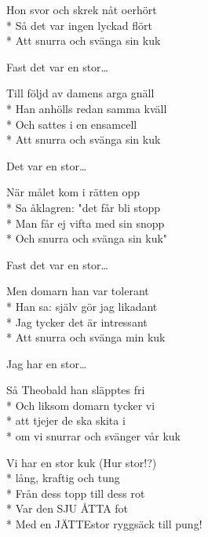\begin{SongText}
\begin{SongVerse}
        Hon svor och skrek nåt oerhört\\*%
        Så det var ingen lyckad flört\\*%
        Att snurra och svänga sin kuk
    \end{SongVerse}
    \begin{SongVerse}
        Fast det var en stor…
    \end{SongVerse}
    \begin{SongVerse}
        Till följd av damens arga gnäll\\*%
        Han anhölls redan samma kväll\\*%
        Och sattes i en ensamcell\\*%
        Att snurra och svänga sin kuk
    \end{SongVerse}
    \begin{SongVerse}
        Det var en stor…
    \end{SongVerse}
    \begin{SongVerse}
        När målet kom i rätten opp\\*%
        Sa åklagren: "det får bli stopp\\*%
        Man får ej vifta med sin snopp\\*%
        Och snurra och svänga sin kuk"
    \end{SongVerse}
    \begin{SongVerse}
        Fast det var en stor…
    \end{SongVerse}
    \begin{SongVerse}
        Men domarn han var tolerant\\*%
        Han sa: själv gör jag likadant\\*%
        Jag tycker det är intressant\\*%
        Att snurra och svänga min kuk
    \end{SongVerse}
    \begin{SongVerse}
        Jag har en stor…
    \end{SongVerse}
    \begin{SongVerse}
        Så Theobald han släpptes fri\\*%
        Och liksom domarn tycker vi\\*%
        att tjejer de ska skita i\\*%
        om vi snurrar och svänger vår kuk
    \end{SongVerse}
    \begin{SongVerse}
        Vi har en stor kuk (Hur stor!?)\\*%
        lång, kraftig och tung\\*%
        Från dess topp till dess rot\\*%
        Var den SJU ÅTTA fot\\*%
        Med en JÄTTEstor ryggsäck till pung!
    \end{SongVerse}
\end{SongText}
